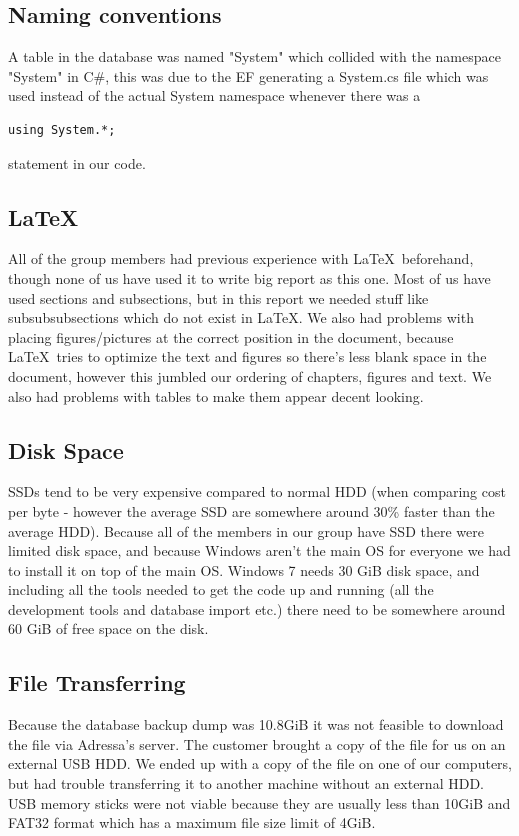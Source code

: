 \subsection{Naming conventions}
A table in the database was named "System" which collided with the namespace "System" in C\#, this was due to the EF generating a System.cs file which was used instead of the actual System namespace whenever there was a 
\begin{lstlisting}
using System.*;
\end{lstlisting}
statement in our code.

\subsection{\LaTeX}
All of the group members had previous experience with \LaTeX \ beforehand, though none of us have used it to write big report as this one. Most of us have used sections and subsections, but in this report we needed stuff like subsubsubsections which do not exist in \LaTeX . We also had problems with placing figures/pictures at the correct position in the document, because \LaTeX \ tries to optimize the text and figures so there's less blank space in the document, however this jumbled our ordering of chapters, figures and text. We also had problems with tables to make them appear decent looking.


\subsection{Disk Space}
SSDs tend to be very expensive compared to normal HDD (when comparing cost per byte - however the average SSD are somewhere around 30\% faster than the average HDD). 
Because all of the members in our group have SSD there were limited disk space, and because Windows aren't the main OS for everyone we had to install it on top of the main OS. Windows 7 needs 30 GiB disk space, and including all the tools needed to get the code up and running (all the development tools and database import etc.) there need to be somewhere around 60 GiB of free space on the disk.

\subsection{File Transferring}
Because the database backup dump was 10.8GiB it was not feasible to download the file via Adressa's server. The customer brought a copy of the file for us on an external USB HDD. We ended up with a copy of the file on one of our computers, but had trouble transferring it to another machine without an external HDD. USB memory sticks were not viable because they are usually less than 10GiB and FAT32 format which has a maximum file size limit of 4GiB. 

